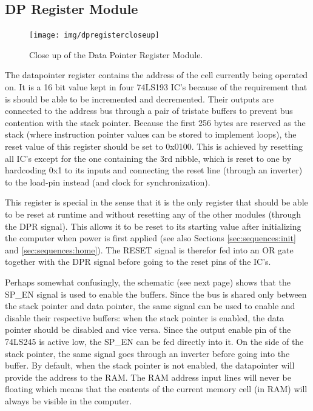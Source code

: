 
\subsection{DP Register Module}
\begin{figure}[H]
  \centering
  \texttt{[image: img/dpregistercloseup]}
  \caption{Close up of the Data Pointer Register Module.}
  \label{fig:dpregcloseup}
\end{figure}

The datapointer register contains the address of the cell currently being operated on. It is a 16 bit value kept in four 74LS193 IC's because of the requirement that is should be able to be incremented and decremented. Their outputs are connected to the address bus through a pair of tristate buffers to prevent bus contention with the stack pointer. Because the first 256 bytes are reserved as the stack (where instruction pointer values can be stored to implement loops), the reset value of this register should be set to 0x0100. This is achieved by resetting all IC's except for the one containing the 3rd nibble, which is reset to one by hardcoding 0x1 to its inputs and connecting the reset line (through an inverter) to the load-pin instead (and clock for synchronization).

This register is special in the sense that it is the only register that should be able to be reset at runtime and without resetting any of the other modules (through the DPR signal). This allows it to be reset to its starting value after initializing the computer when power is first applied (see also Sections \ref{sec:sequences:init} and \ref{sec:sequences:home}). The RESET signal is therefor fed into an OR gate together with the DPR signal before going to the reset pins of the IC's.

Perhaps somewhat confusingly, the schematic (see next page) shows that the SP\_EN signal is used to enable the buffers. Since the bus is shared only between the stack pointer and data pointer, the same signal can be used to enable and disable their respective buffers: when the stack pointer is enabled, the data pointer should be disabled and vice versa. Since the output enable pin of the 74LS245 is active low, the SP\_EN can be fed directly into it. On the side of the stack pointer, the same signal goes through an inverter before going into the buffer. By default, when the stack pointer is not enabled, the datapointer will provide the address to the RAM. The RAM address input lines will never be floating which means that the contents of the current memory cell (in RAM) will always be visible in the computer.


